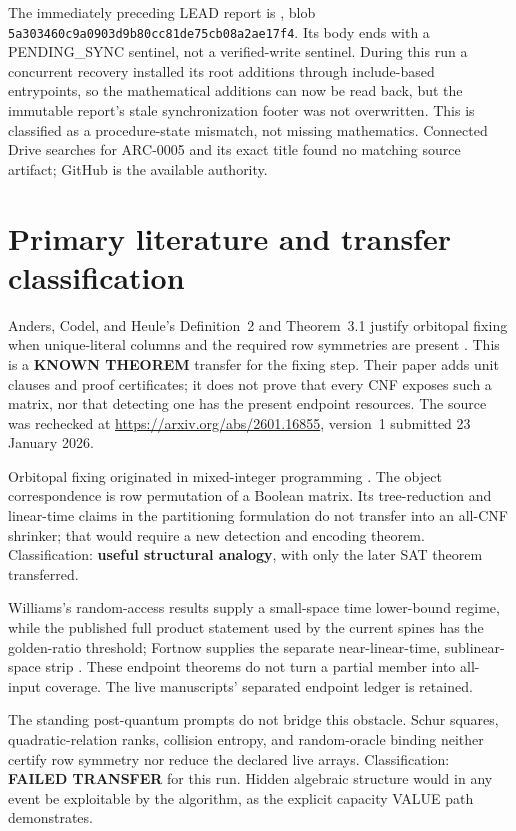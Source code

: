 \documentclass[11pt]{article}
\begin{document}
The immediately preceding LEAD report is
, blob
\texttt{5a303460c9a0903d9b80cc81de75cb08a2ae17f4}.  Its body ends with a
PENDING\_SYNC sentinel, not a verified-write sentinel.  During this run a
concurrent recovery installed its root additions through include-based
entrypoints, so the mathematical additions can now be read back, but the
immutable report's stale synchronization footer was not overwritten.
This is classified as a procedure-state mismatch, not missing mathematics.
Connected Drive searches for ARC-0005 and its exact title found no matching
source artifact; GitHub is the available authority.

\section{Primary literature and transfer classification}
Anders, Codel, and Heule's Definition~2 and Theorem~3.1 justify orbitopal
fixing when unique-literal columns and the required row symmetries are
present \cite{anderscodelheule2026orbitopal}.  This is a \textbf{KNOWN
THEOREM} transfer for the fixing step.  Their paper adds unit clauses and
proof certificates; it does not prove that every CNF exposes such a matrix,
nor that detecting one has the present endpoint resources.  The source was
rechecked at \url{https://arxiv.org/abs/2601.16855}, version~1 submitted
23 January 2026.

Orbitopal fixing originated in mixed-integer programming
\cite{kaibelpeinhardtpfetsch2006}.  The object correspondence is row
permutation of a Boolean matrix.  Its tree-reduction and linear-time claims in
the partitioning formulation do not transfer into an all-CNF shrinker; that
would require a new detection and encoding theorem.  Classification:
\textbf{useful structural analogy}, with only the later SAT theorem transferred.

Williams's random-access results supply a small-space time lower-bound regime,
while the published full product statement used by the current spines has the
golden-ratio threshold; Fortnow supplies the separate near-linear-time,
sublinear-space strip \cite{williams2010,fortnow2000}.  These endpoint theorems
do not turn a partial member into all-input coverage.  The live manuscripts'
separated endpoint ledger is retained.

The standing post-quantum prompts do not bridge this obstacle.  Schur squares,
quadratic-relation ranks, collision entropy, and random-oracle binding neither
certify row symmetry nor reduce the declared live arrays.  Classification:
\textbf{FAILED TRANSFER} for this run.  Hidden algebraic structure would in
any event be exploitable by the algorithm, as the explicit capacity VALUE
path demonstrates.
\end{document}
